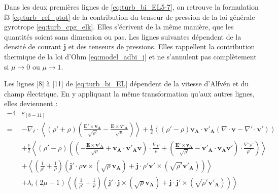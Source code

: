 Dans les deux premières lignes de \eqref{eq:turb_bi_EL5-7}, on retrouve la formulation f3 \eqref{eq:turb_ref_ptot} de la  contribution du tenseur de pression de la loi générale  gyrotrope \eqref{eq:turb_cpg_elk}. Elles s'écrivent de la même manière, que les quantités soient sans dimension ou pas. Les lignes suivantes dépendent de la densité de courant $\boldsymbol{j}$ et des tenseurs de pressions. Elles rappellent la contribution thermique de la loi d'Ohm \eqref{eq:model_adbi_j} et ne s'annulent pas complètement si $\mu \rightarrow 0$ ou $\mu \rightarrow 1$. 

Les lignes [8] à [11] de \eqref{eq:turb_bi_EL} dépendent de la vitesse d'Alfvén et du champ électrique. En y appliquant la même transformation qu'aux autres lignes, elles deviennent : 
\begin{equation}\begin{array}{rl}%
  - 4&  \varepsilon_{[8-11]}  \\%
   =&- \nabla_{\boldsymbol{\ell}} \cdot \left< \left(\rho' + \rho\right) \left(\frac{ \boldsymbol{E'}\times \boldsymbol{v_A} }{\sqrt{\rho'}} - \frac{ \boldsymbol{E}\times \boldsymbol{v'_A} }{\sqrt{\rho}}\right)\right> +  \frac{1}{2}\left<\left(\rho' - \rho\right) \boldsymbol{v_A} \cdot \boldsymbol{v'_{A}} \left(  \nabla \cdot \boldsymbol{v}-  \nabla' \cdot \boldsymbol{v'}\right)\right> \\ %
  &+\frac{1}{2} \left<\left(\rho' - \rho\right) \left(\left(-\frac{ \boldsymbol{E}\times \boldsymbol{v'_A} }{\sqrt{\rho}} + \boldsymbol{v_A} \cdot \boldsymbol{v'_{A}} \boldsymbol{v}\right) \cdot \frac{\nabla  \rho }{\rho}+\left(\frac{ \boldsymbol{E'}\times \boldsymbol{v_A} }{\sqrt{\rho'}} - \boldsymbol{v'_A} \cdot \boldsymbol{v_{A}} \boldsymbol{v'}\right) \cdot \frac{\nabla'  \rho' }{\rho'}\right)\right> \\%
        &+ \left<\left(\frac{1}{\rho'}+ \frac{1}{\rho}\right)\left(  \boldsymbol{j'} \cdot   \rho\boldsymbol{v}  \times \left( \sqrt{\rho}\boldsymbol{v_A}\right) 
        +  \boldsymbol{j} \cdot \rho' \boldsymbol{v'}\times \left( \sqrt{\rho'}\boldsymbol{v'_A}\right)
        \right)\right> \\%
        &+ \lambda_i\left(2\mu-1\right) \left<\left(\frac{1}{\rho'}+ \frac{1}{\rho}\right)\left( \boldsymbol{j'} \cdot \boldsymbol{j} \times \left( \sqrt{\rho}\boldsymbol{v_A}\right) + \boldsymbol{j} \cdot  \boldsymbol{j'} \times \left( \sqrt{\rho'}\boldsymbol{v'_A}\right)\right)\right> \\%

\end{array}
\end{equation}
